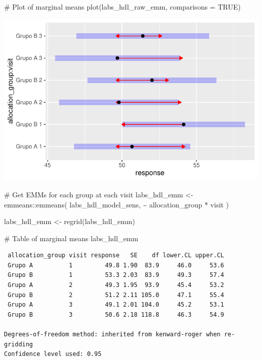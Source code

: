 \documentclass[
  letterpaper,
  DIV=11,
  numbers=noendperiod]{scrartcl}
\newenvironment{Shaded}{\begin{snugshade}}{\end{snugshade}}
\newcommand{\AttributeTok}[1]{\textcolor[rgb]{0.40,0.45,0.13}{#1}}
\newcommand{\CommentTok}[1]{\textcolor[rgb]{0.37,0.37,0.37}{#1}}
\newcommand{\ConstantTok}[1]{\textcolor[rgb]{0.56,0.35,0.01}{#1}}
\newcommand{\FunctionTok}[1]{\textcolor[rgb]{0.28,0.35,0.67}{#1}}
\newcommand{\NormalTok}[1]{\textcolor[rgb]{0.00,0.23,0.31}{#1}}
\newcommand{\OtherTok}[1]{\textcolor[rgb]{0.00,0.23,0.31}{#1}}
\newcommand{\SpecialCharTok}[1]{\textcolor[rgb]{0.37,0.37,0.37}{#1}}
\begin{document}
\begin{Shaded}
\begin{Highlighting}[]
\CommentTok{\# Plot of marginal means}
\FunctionTok{plot}\NormalTok{(labs\_hdl\_raw\_emm, }\AttributeTok{comparisons =} \ConstantTok{TRUE}\NormalTok{)}
\end{Highlighting}
\end{Shaded}

\includegraphics{Outcomes_V1V2V3_files/figure-pdf/labs_hdl_raw_emm-1.pdf}

\begin{Shaded}
\begin{Highlighting}[]
\CommentTok{\# Get EMMs for each group at each visit}
\NormalTok{labs\_hdl\_emm }\OtherTok{\textless{}{-}}\NormalTok{ emmeans}\SpecialCharTok{::}\FunctionTok{emmeans}\NormalTok{(}
\NormalTok{    labs\_hdl\_model\_sens, }
    \SpecialCharTok{\textasciitilde{}}\NormalTok{ allocation\_group }\SpecialCharTok{*}\NormalTok{ visit}
\NormalTok{)}

\NormalTok{labs\_hdl\_emm }\OtherTok{\textless{}{-}} \FunctionTok{regrid}\NormalTok{(labs\_hdl\_emm)}

\CommentTok{\# Table of marginal means}
\NormalTok{labs\_hdl\_emm}
\end{Highlighting}
\end{Shaded}

\begin{verbatim}
 allocation_group visit response   SE    df lower.CL upper.CL
 Grupo A          1         49.8 1.90  83.9     46.0     53.6
 Grupo B          1         53.3 2.03  83.9     49.3     57.4
 Grupo A          2         49.3 1.95  93.9     45.4     53.2
 Grupo B          2         51.2 2.11 105.0     47.1     55.4
 Grupo A          3         49.1 2.01 104.0     45.2     53.1
 Grupo B          3         50.6 2.18 118.8     46.3     54.9

Degrees-of-freedom method: inherited from kenward-roger when re-gridding 
Confidence level used: 0.95 
\end{verbatim}
\end{document}
